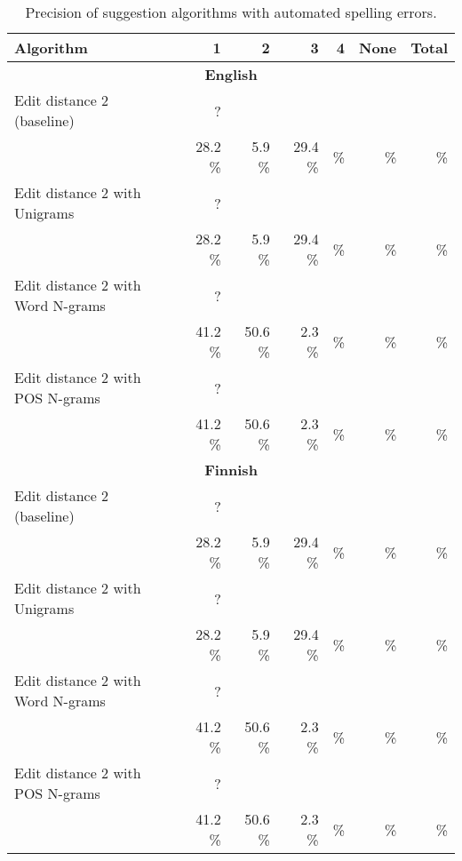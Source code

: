\documentclass{llncs}
\begin{document}
\begin{table*}
    \caption{Precision of suggestion algorithms with automated spelling errors.
    \label{table:fake-eval}}
  \begin{center}
      \begin{tabular}{lrrrrrr}
        \hline
        Algorithm & 1 & 2 & 3 & 4 & None & Total \\
        \hline
        \multicolumn{7}{c}{\textbf{English}} \\
        \hline
        Edit distance 2 (baseline) 
&    ?   &       &      &      &       &     \\
& 28.2 \% & 5.9 \% & 29.4 \% &     \% &     \%  &       \% \\
        \hline
        Edit distance 2 with Unigrams 
&    ?   &       &      &      &       &     \\
& 28.2 \% & 5.9 \% & 29.4 \% &     \% &     \%  &       \% \\
        \hline
        Edit distance 2 with Word N-grams 
&     ?  &       &      &      &       &     \\
& 41.2 \% & 50.6 \% & 2.3 \% &     \% &      \% &       \% \\
        \hline
        Edit distance 2 with POS N-grams 
&     ?  &       &      &      &       &     \\
& 41.2 \% & 50.6 \% & 2.3 \% &     \% &      \% &       \% \\
        \hline
        \multicolumn{7}{c}{\textbf{Finnish}} \\
        \hline
        Edit distance 2 (baseline) 
&    ?   &       &      &      &       &     \\
& 28.2 \% & 5.9 \% & 29.4 \% &     \% &     \%  &       \% \\
        \hline
        Edit distance 2 with Unigrams 
&    ?   &       &      &      &       &     \\
& 28.2 \% & 5.9 \% & 29.4 \% &     \% &     \%  &       \% \\
        \hline
        Edit distance 2 with Word N-grams 
&     ?  &       &      &      &       &     \\
& 41.2 \% & 50.6 \% & 2.3 \% &     \% &      \% &       \% \\
        \hline
        Edit distance 2 with POS N-grams 
&     ?  &       &      &      &       &     \\
& 41.2 \% & 50.6 \% & 2.3 \% &     \% &      \% &       \% \\
        \hline
      \end{tabular}
  \end{center}
\end{table*}
\end{document}
